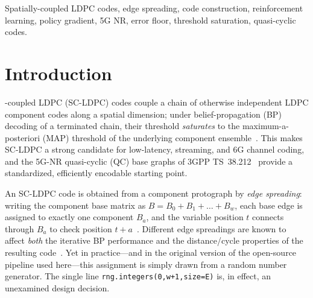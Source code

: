 \documentclass[journal]{IEEEtran}
\begin{document}
\begin{abstract}
and hence why a search-based construction is needed. A validated protograph EXIT
(PEXIT) analysis (correctness gate within $0.005$\,dB of the $(3,6)$ textbook
threshold) explains the rate dependence of the waterfall gain via threshold
saturation: the asymptotic threshold is construction-invariant within a rate
cell ($\le0.04$\,dB spread) yet tracks the Monte-Carlo waterfall across rates
(Spearman $0.90$--$1.00$). \textbf{(C3)} We give a deployable criterion for
\emph{when} reinforcement learning helps: its sample-efficiency advantage over
blind random search grows monotonically with per-evaluation cost and search-space
size $(w{+}1)^E$---RL wins $13/15$ long-code cells (advantage growing with $w$),
while under a cheap surrogate it merely ties. \textbf{(C4)} The feature policy
transfers \emph{zero-shot} to new lifting sizes and rates, a deployment property
that random search and the cross-entropy method (CEM) cannot offer.
\end{abstract}

\begin{IEEEkeywords}
Spatially-coupled LDPC codes, edge spreading, code construction,
reinforcement learning, policy gradient, 5G NR, error floor,
threshold saturation, quasi-cyclic codes.
\end{IEEEkeywords}

\section{Introduction}\label{sec:intro}
-coupled LDPC (SC-LDPC) codes couple a chain of
otherwise independent LDPC component codes along a spatial dimension; under
belief-propagation (BP) decoding of a terminated chain, their threshold
\emph{saturates} to the maximum-a-posteriori (MAP) threshold of the underlying
component ensemble~\cite{kudekar2011threshold,felstrom1999ldpcc}. This makes
SC-LDPC a strong candidate for low-latency, streaming, and 6G channel coding,
and the 5G-NR quasi-cyclic (QC) base graphs of 3GPP TS~38.212~\cite{3gpp38212}
provide a standardized, efficiently encodable starting point.

An SC-LDPC code is obtained from a component protograph by \emph{edge
spreading}: writing the component base matrix as
$B = B_0 + B_1 + \dots + B_w$, each base edge is assigned to exactly one
component $B_a$, and the variable position $t$ connects through $B_a$ to check
position $t{+}a$~\cite{mitchell2015scldpc}. Different edge spreadings are known
to affect \emph{both} the iterative BP performance and the distance/cycle
properties of the resulting code~\cite{mitchell2015scldpc}. Yet in practice---and
in the original version of the open-source pipeline used here---this assignment
is simply drawn from a random number generator. The single line
\texttt{rng.integers(0,w+1,size=E)} is, in effect, an unexamined design
decision.
\end{document}
